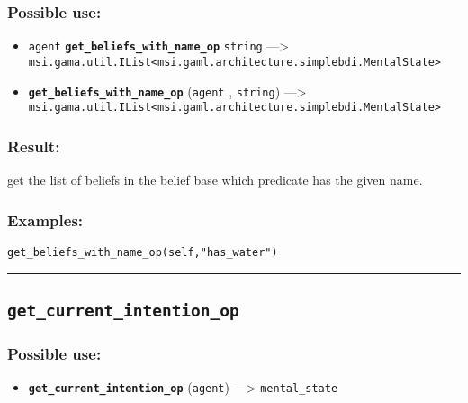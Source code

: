 \documentclass[]{book}
\providecommand{\tightlist}{%
  \setlength{\itemsep}{0pt}\setlength{\parskip}{0pt}}
\theoremstyle{definition}
\theoremstyle{definition}
\theoremstyle{definition}
\theoremstyle{remark}
\begin{document}
\subsubsection{Possible use:}\label{possible-use-200}

\begin{itemize}
\tightlist
\item
  \texttt{agent} \textbf{\texttt{get\_beliefs\_with\_name\_op}}
  \texttt{string} ---\textgreater{}
  \texttt{msi.gama.util.IList\textless{}msi.gaml.architecture.simplebdi.MentalState\textgreater{}}
\item
  \textbf{\texttt{get\_beliefs\_with\_name\_op}} (\texttt{agent} ,
  \texttt{string}) ---\textgreater{}
  \texttt{msi.gama.util.IList\textless{}msi.gaml.architecture.simplebdi.MentalState\textgreater{}}
\end{itemize}

\subsubsection{Result:}\label{result-194}

get the list of beliefs in the belief base which predicate has the given
name.

\subsubsection{Examples:}\label{examples-147}

\begin{verbatim}
get_beliefs_with_name_op(self,"has_water") 
\end{verbatim}

\begin{center}\rule{0.5\linewidth}{\linethickness}\end{center}

\subsection{\texorpdfstring{\texttt{get\_current\_intention\_op}}{get\_current\_intention\_op}}\label{get_current_intention_op}

\subsubsection{Possible use:}\label{possible-use-201}

\begin{itemize}
\tightlist
\item
  \textbf{\texttt{get\_current\_intention\_op}} (\texttt{agent})
  ---\textgreater{} \texttt{mental\_state}
\end{itemize}
\end{document}
